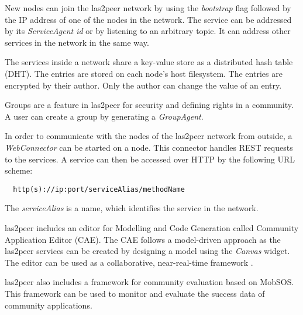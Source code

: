 New nodes can join the las2peer network by using the \emph{bootstrap} flag followed by the IP address of one of the nodes in the network. The service can be addressed by its \emph{ServiceAgent id}  or by listening to an arbitrary topic. It can address other services in the network in the same way. 

The services inside a network share a key-value store as a distributed hash table (DHT). The entries are stored on each node's host filesystem. The entries are encrypted by their author. Only the author can change the value of an entry.


Groups are a feature in las2peer for security and defining rights in a community. 
A user can create a group by generating a \emph{GroupAgent}. 

In order to communicate with the nodes of the las2peer network from outside, a \emph{WebConnector} can be started on a node. This connector handles REST requests to the services. A service can then be accessed over HTTP by the following URL scheme: 
\begin{lstlisting}
  http(s)://ip:port/serviceAlias/methodName
\end{lstlisting}
The \emph{serviceAlias} is a name, which identifies the service in the network. 

las2peer includes an editor for Modelling and Code Generation called Community Application Editor (CAE). 
The CAE follows a model-driven approach as the  las2peer services can be created by designing a model using the \emph{Canvas} widget. The editor can be used as a collaborative, near-real-time framework \cite{dND*16}. 

las2peer also includes a framework for community evaluation based on MobSOS. This framework can be used to monitor and evaluate the success data of community applications.

